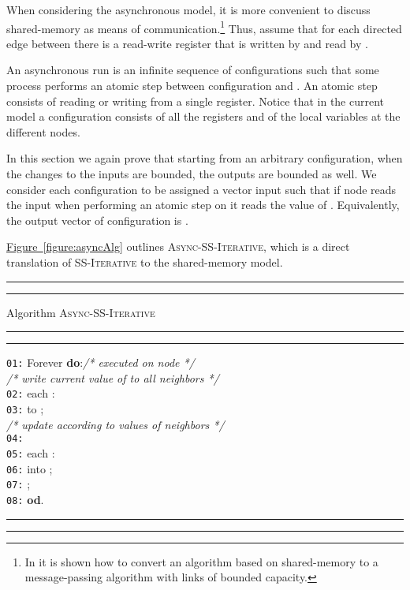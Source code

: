 \documentclass[preprint,12pt]{elsarticle}
\newcommand{\namedref}[2]{\hyperref[#2]{#1~\ref*{#2}}}
\newcommand{\figureref}[1]{\namedref{Figure}{#1}}
\newcommand{\tb}{\makebox[0.4cm]{}}
\newcommand{\due}{\makebox[0.8cm]{}}
\newcommand{\syncAlg}{\textsc{SS-Iterative}\xspace}
\newcommand{\asyncAlg}{\textsc{Async-SS-Iterative}\xspace}
\newcommand{\linenumber}[1]{{\tt #1}}
\begin{document}
When considering the asynchronous model, it is more convenient to
discuss shared-memory as means of communication.\footnote{In
\cite{DolevSSBook} it is shown how to convert an algorithm based
on shared-memory to a message-passing algorithm with links of
bounded capacity.} Thus, assume that for each directed edge
between  there is a read-write register 
that is written by  and read by .

An asynchronous run is an infinite sequence of configurations  such that some process 
performs an atomic step between configuration  and
. An atomic step consists of reading or writing from a
single register. Notice that in the current model a configuration
consists of all the registers and of the local variables at the
different nodes.

In this section we again prove that starting from an arbitrary
configuration, when the changes to the inputs are bounded, the outputs are
bounded as well. We consider each configuration  to be
assigned a vector input  such that if node  reads the
input when performing an atomic step on  it reads the value
of . Equivalently, the output vector of configuration
 is .

\figureref{figure:asyncAlg} outlines \asyncAlg, which is a direct
translation of \syncAlg to the shared-memory model.

\begin{figure*}[h]
\begin{center}
\begin{minipage}{4.8in}
\hrule \hrule \vspace{1.7mm} \footnotesize
\setlength{\baselineskip}{3.9mm} \noindent Algorithm \asyncAlg
 \vspace{1mm} \hrule \hrule
\vspace{1mm}

\linenumber{01:} Forever {\bf do}:\hfill\textit{/* executed on
node 
*/}\\

\makebox[0.93cm]{} \textit{/* write current value of  to all neighbors */}\\
\linenumber{02:} \tb {\bf for} each :  \\
\linenumber{03:} \due {\bf write}  to ; \\

\makebox[0.93cm]{} \textit{/* update  according to values of neighbors */}\\
\linenumber{04:} \tb {\bf set}   \\
\linenumber{05:} \tb {\bf for} each :  \\
\linenumber{06:} \due {\bf read}  into ;  \\
\linenumber{07:} \due {\bf update} ;\\

\linenumber{08:} {\bf od}.

\normalsize \vspace{1mm} \hrule\hrule
\end{minipage}
 \caption{A self-stabilizing iterative algorithm for asynchronous networks.}\label{figure:asyncAlg}
 \end{center}
\end{figure*}
\end{document}
